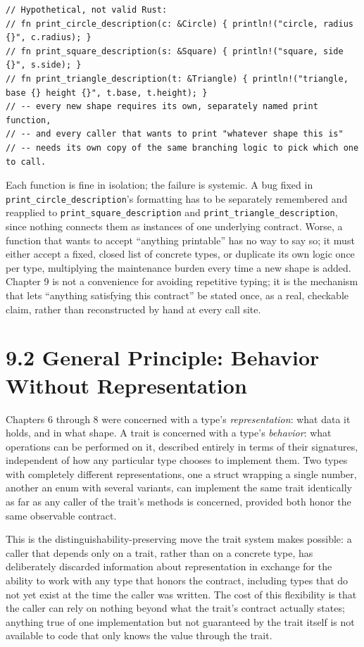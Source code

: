 \documentclass[11pt]{book}
\begin{document}
\begin{lstlisting}
// Hypothetical, not valid Rust:
// fn print_circle_description(c: &Circle) { println!("circle, radius {}", c.radius); }
// fn print_square_description(s: &Square) { println!("square, side {}", s.side); }
// fn print_triangle_description(t: &Triangle) { println!("triangle, base {} height {}", t.base, t.height); }
// -- every new shape requires its own, separately named print function,
// -- and every caller that wants to print "whatever shape this is"
// -- needs its own copy of the same branching logic to pick which one to call.
\end{lstlisting}

Each function is fine in isolation; the failure is systemic. A bug fixed in \texttt{print\_circle\_description}'s formatting has to be separately remembered and reapplied to \texttt{print\_square\_description} and \texttt{print\_triangle\_description}, since nothing connects them as instances of one underlying contract. Worse, a function that wants to accept ``anything printable'' has no way to say so; it must either accept a fixed, closed list of concrete types, or duplicate its own logic once per type, multiplying the maintenance burden every time a new shape is added. Chapter 9 is not a convenience for avoiding repetitive typing; it is the mechanism that lets ``anything satisfying this contract'' be stated once, as a real, checkable claim, rather than reconstructed by hand at every call site.

\section*{9.2 General Principle: Behavior Without Representation}

Chapters 6 through 8 were concerned with a type's \emph{representation}: what data it holds, and in what shape. A trait is concerned with a type's \emph{behavior}: what operations can be performed on it, described entirely in terms of their signatures, independent of how any particular type chooses to implement them. Two types with completely different representations, one a struct wrapping a single number, another an enum with several variants, can implement the same trait identically as far as any caller of the trait's methods is concerned, provided both honor the same observable contract.

This is the distinguishability-preserving move the trait system makes possible: a caller that depends only on a trait, rather than on a concrete type, has deliberately discarded information about representation in exchange for the ability to work with any type that honors the contract, including types that do not yet exist at the time the caller was written. The cost of this flexibility is that the caller can rely on nothing beyond what the trait's contract actually states; anything true of one implementation but not guaranteed by the trait itself is not available to code that only knows the value through the trait.
\end{document}
